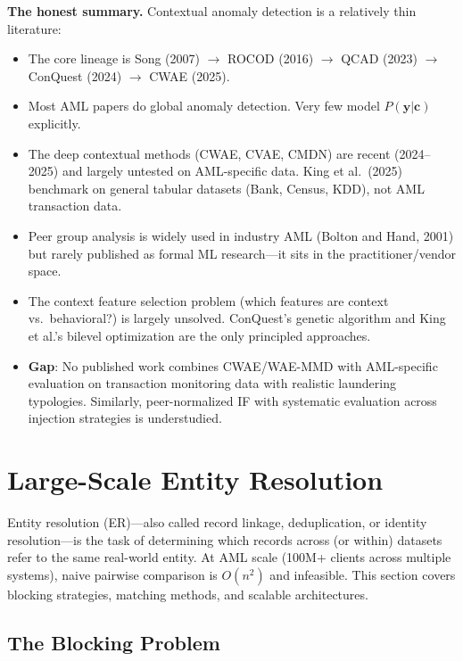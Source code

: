 \documentclass[11pt]{article}
\begin{document}
\textbf{The honest summary.} Contextual anomaly detection is a relatively thin literature:
\begin{itemize}
\item The core lineage is Song (2007) $\to$ ROCOD (2016) $\to$ QCAD (2023) $\to$ ConQuest (2024) $\to$ CWAE (2025).
\item Most AML papers do global anomaly detection. Very few model $P(\mathbf{y}|\mathbf{c})$ explicitly.
\item The deep contextual methods (CWAE, CVAE, CMDN) are recent (2024--2025) and largely untested on AML-specific data. King et al.\ (2025) benchmark on general tabular datasets (Bank, Census, KDD), not AML transaction data.
\item Peer group analysis is widely used in industry AML (Bolton and Hand, 2001) but rarely published as formal ML research---it sits in the practitioner/vendor space.
\item The context feature selection problem (which features are context vs.\ behavioral?) is largely unsolved. ConQuest's genetic algorithm and King et al.'s bilevel optimization are the only principled approaches.
\item \textbf{Gap}: No published work combines CWAE/WAE-MMD with AML-specific evaluation on transaction monitoring data with realistic laundering typologies. Similarly, peer-normalized IF with systematic evaluation across injection strategies is understudied.
\end{itemize}

\section{Large-Scale Entity Resolution}

Entity resolution (ER)---also called record linkage, deduplication, or identity resolution---is the task of determining which records across (or within) datasets refer to the same real-world entity. At AML scale (100M+ clients across multiple systems), naive pairwise comparison is $O(n^2)$ and infeasible. This section covers blocking strategies, matching methods, and scalable architectures.

\subsection{The Blocking Problem}
\end{document}
